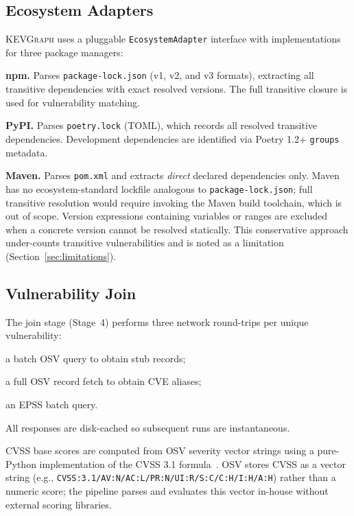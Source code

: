 \documentclass[conference]{IEEEtran}
\newcommand{\kevgraph}{\textsc{KEVGraph}\xspace}
\begin{document}
\subsection{Ecosystem Adapters}
\label{sec:adapters}

\kevgraph uses a pluggable \texttt{EcosystemAdapter} interface with
implementations for three package managers:

\textbf{npm.}  Parses \texttt{package-lock.json} (v1, v2, and v3
formats), extracting all transitive dependencies with exact resolved
versions.  The full transitive closure is used for vulnerability
matching.

\textbf{PyPI.}  Parses \texttt{poetry.lock} (TOML), which records all
resolved transitive dependencies.  Development dependencies are
identified via Poetry 1.2+ \texttt{groups} metadata.

\textbf{Maven.}  Parses \texttt{pom.xml} and extracts
\emph{direct} declared dependencies only.  Maven has no
ecosystem-standard lockfile analogous to \texttt{package-lock.json};
full transitive resolution would require invoking the Maven build
toolchain, which is out of scope.  Version expressions containing
variables or ranges are excluded when a concrete version cannot be
resolved statically.  This conservative approach under-counts
transitive vulnerabilities and is noted as a limitation
(Section~\ref{sec:limitations}).

\subsection{Vulnerability Join}

The join stage (Stage~4) performs three network round-trips per unique
vulnerability:
\begin{enumerate*}[label=(\roman*)]
  \item a batch OSV query to obtain stub records;
  \item a full OSV record fetch to obtain CVE aliases;
  \item an EPSS batch query.
\end{enumerate*}
All responses are disk-cached so subsequent runs are instantaneous.

CVSS base scores are computed from OSV severity vector strings using a
pure-Python implementation of the CVSS 3.1 formula~\cite{cvss31}.
OSV stores CVSS as a vector string (e.g.,
\texttt{CVSS:3.1/AV:N/AC:L/PR:N/UI:R/S:C/C:H/I:H/A:H}) rather than a
numeric score; the pipeline parses and evaluates this vector
in-house without external scoring libraries.
\end{document}
